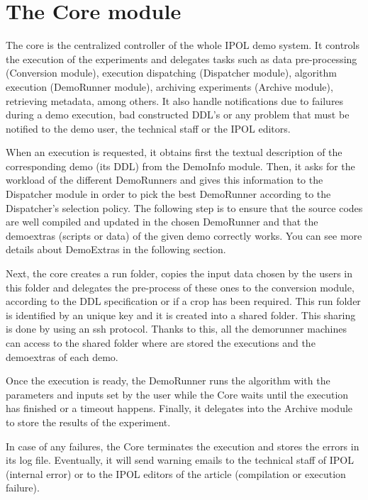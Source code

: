 \section{The Core module}
The core is the centralized controller of the whole IPOL demo system. It controls the execution of the experiments and delegates tasks such as data pre-processing (Conversion module), execution dispatching (Dispatcher module), algorithm execution (DemoRunner module), archiving experiments (Archive module), retrieving metadata, among others. It also handle notifications due to failures during a demo execution, bad constructed DDL's or any problem that must be notified to the demo user, the technical staff or the IPOL editors.

When an execution is requested, it obtains first the textual description of the corresponding demo (its DDL) from the DemoInfo module. Then, it asks for the workload of the different DemoRunners and gives this information to the Dispatcher module in order to pick the best DemoRunner according to the Dispatcher's selection policy. The following step is to ensure that the source codes are well compiled and updated in the chosen DemoRunner and that the demoextras (scripts or data) of the given demo correctly works. You can see more details about DemoExtras in the following section.

Next, the core creates a run folder, copies the input data chosen by the users in this folder and delegates the pre-process of these ones to the conversion module, according to the DDL specification or if a crop has been required. This run folder is identified by an unique key and it is created into a shared folder. This sharing is done by using an ssh protocol. Thanks to this, all the demorunner machines can access to the shared folder where are stored the executions and the demoextras of each demo. 

Once the execution is ready, the DemoRunner runs the algorithm with the parameters and inputs set by the user while the Core waits until the execution has finished or a timeout happens. Finally, it delegates into the Archive module to store the results of the experiment. 

In case of any failures, the Core terminates the execution and stores the errors in its log file. Eventually, it will send warning emails to the technical staff of IPOL (internal error) or to the IPOL editors of the article (compilation or execution failure).


